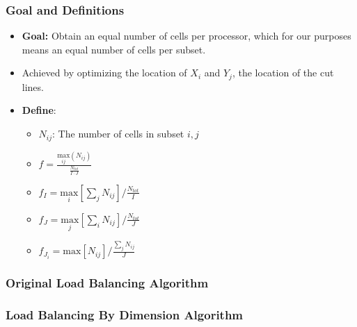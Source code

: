 \documentclass[compress]{beamer}
\begin{document}
\begin{frame}[t]\frametitle{ Goal and Definitions}
	\begin{block}{}
	
		\begin{itemize}
			\item \textbf{Goal:} Obtain an equal number of cells per processor, which for our purposes means an equal number of cells per subset.
			\item Achieved by optimizing the location of $X_i$ and $Y_j$, the location of the cut lines.
			\item \textbf{Define}:
			\begin{itemize}
			\item $N_{ij}$: The number of cells  in subset ${i,j}$
			\item $f =\frac{\underset{ij}{\text{max}}(N_{ij})}{\frac{N_{tot}}{I\cdot J}}$
			\item $f_I = \underset{i}{\text{max}}[\sum_{j} N_{ij}]/\frac{N_{tot}}{I}$
			\item $f_J = \underset{j}{\text{max}}[\sum_{i} N_{ij}]/\frac{N_{tot}}{J}$
			\item $f_{J_i} = \text{max}[N_{ij}]/\frac{\sum_{j}N_{ij}}{J}$
			\end{itemize}
		\end{itemize}
	\end{block}
\end{frame}

\begin{frame}[t]\frametitle{Original Load Balancing Algorithm}
\vspace{-0.5 cm}
\begin{block}{}

\end{block}
\end{frame}

\begin{frame}[t]\frametitle{Load Balancing By Dimension Algorithm}
\vspace{-0.5 cm}
\begin{block}{}

\end{block}
\end{frame}
\end{document}
